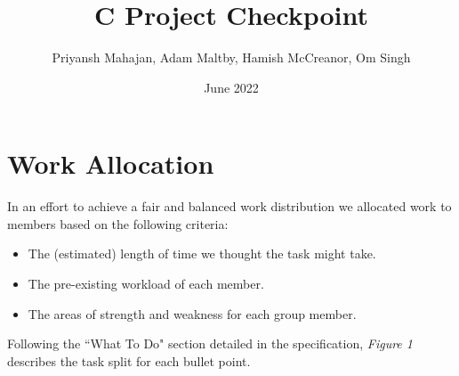 \documentclass{article}
\title{C Project Checkpoint}
\author{Priyansh Mahajan, Adam Maltby, Hamish McCreanor, Om Singh}
\date{June 2022}
\begin{document}
\maketitle

\section{Work Allocation}
In an effort to achieve a fair and balanced work distribution we allocated work to members based on the following criteria:

\begin{itemize}
    \item The (estimated) length of time we thought the task might take.
    \item The pre-existing workload of each member.
    \item The areas of strength and weakness for each group member.
\end{itemize}

Following the ``What To Do" section detailed in the specification, \emph{Figure 1} describes the task split for each bullet point.
\end{document}

